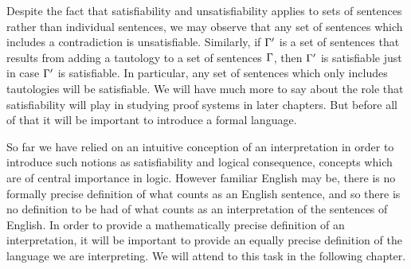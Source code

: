 Despite the fact that satisfiability and unsatisfiability applies to sets of sentences rather than individual sentences, we may observe that any set of sentences which includes a contradiction is unsatisfiable.
Similarly, if $\Gamma'$ is a set of sentences that results from adding a tautology to a set of sentences $\Gamma$, then $\Gamma'$ is satisfiable just in case $\Gamma'$ is satisfiable. 
In particular, any set of sentences which only includes tautologies will be satisfiable.
We will have much more to say about the role that satisfiability will play in studying proof systems in later chapters.
But before all of that it will be important to introduce a formal language.

So far we have relied on an intuitive conception of an interpretation in order to introduce such notions as satisfiability and logical consequence, concepts which are of central importance in logic.
However familiar English may be, there is no formally precise definition of what counts as an English sentence, and so there is no definition to be had of what counts as an interpretation of the sentences of English.
In order to provide a mathematically precise definition of an interpretation, it will be important to provide an equally precise definition of the language we are interpreting.
We will attend to this task in the following chapter.


%
%


